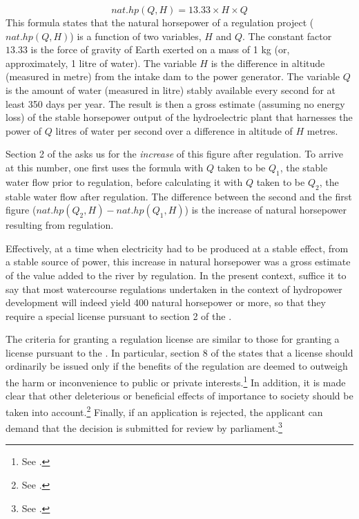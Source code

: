 $$
nat.hp(Q,H) = 13.33 \times H \times Q
$$
This formula states that the natural horsepower of a regulation project ($nat.hp(Q,H)$) is a function of two variables, $H$ and $Q$. The constant factor $13.33$ is the force of gravity of Earth exerted on a mass of 1 kg (or, approximately, 1 litre of water). The variable $H$ is the difference in altitude (measured in metre) from the intake dam to the power generator. The variable $Q$ is the amount of water (measured in litre) stably available every second for at least 350 days per year. The result is then a gross estimate (assuming no energy loss) of the stable horsepower output of the hydroelectric plant that harnesses the power of $Q$ litres of water per second over a difference in altitude of $H$ metres. 

Section 2 of the \cite{wra17} asks us for the {\it increase} of this figure after regulation. To arrive at this number, one first uses the formula with $Q$ taken to be $Q_1$, the stable water flow prior to regulation, before calculating it with $Q$ taken to be $Q_2$, the stable water flow after regulation. The difference between the second and the first figure ($nat.hp(Q_2,H) - nat.hp(Q_1,H)$) is the increase of natural horsepower resulting from regulation.

Effectively, at a time when electricity had to be produced at a stable effect, from a stable source of power, this increase in natural horsepower was a gross estimate of the value added to the river by regulation.
In the present context, suffice it to say that most watercourse regulations undertaken in the context of hydropower development will indeed yield 400 natural horsepower or more, so that they require a special license pursuant to section 2 of the \cite{wra17}. 


The criteria for granting a regulation license are similar to those for granting a license pursuant to the \cite{wra00}. In particular, section 8 of the \cite{wra17} states that a license should ordinarily be issued only if the benefits of the regulation are deemed to outweigh the harm or inconvenience to public or private interests.\footnote{See \cite[8]{wra17}.} In addition, it is made clear that other deleterious or beneficial effects of importance to society should be taken into account.\footnote{See \cite[8]{wra17}.} Finally, if an application is rejected, the applicant can demand that the decision is submitted for review by parliament.\footnote{See \cite[8]{wra17}.}

